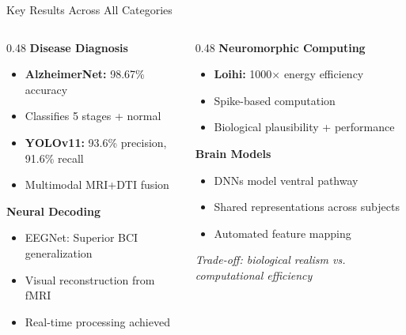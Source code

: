 \documentclass[aspectratio=169]{beamer}
\begin{document}
\begin{frame}{Key Results Across All Categories}
  \begin{columns}[T]
    \begin{column}{0.48\textwidth}
      \textbf{Disease Diagnosis}
      \begin{itemize}
        \item \textbf{AlzheimerNet:} \textcolor{DukeBlue}{98.67\%} accuracy
        \item Classifies 5 stages + normal
        \item \textbf{YOLOv11:} 93.6\% precision, 91.6\% recall
        \item Multimodal MRI+DTI fusion
      \end{itemize}
      
      \vspace{0.5em}
      
      \textbf{Neural Decoding}
      \begin{itemize}
        \item EEGNet: Superior BCI generalization
        \item Visual reconstruction from fMRI
        \item Real-time processing achieved
      \end{itemize}
    \end{column}
    
    \begin{column}{0.48\textwidth}
      \textbf{Neuromorphic Computing}
      \begin{itemize}
        \item \textbf{Loihi:} \textcolor{DukeBlue}{1000×} energy efficiency
        \item Spike-based computation
        \item Biological plausibility + performance
      \end{itemize}
      
      \vspace{0.5em}
      
      \textbf{Brain Models}
      \begin{itemize}
        \item DNNs model ventral pathway
        \item Shared representations across subjects
        \item Automated feature mapping
      \end{itemize}
      
      \vspace{0.5em}
      
      \textit{\small Trade-off: biological realism vs. computational efficiency}
    \end{column}
  \end{columns}
\end{frame}
\end{document}
